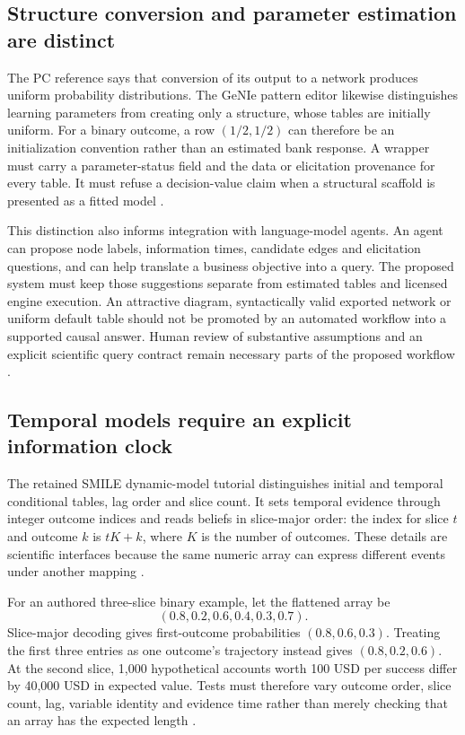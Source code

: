 \subsection{Structure conversion and parameter estimation are distinct}
The PC reference says that conversion of its output to a network produces
uniform probability distributions. The GeNIe pattern editor likewise
distinguishes learning parameters from creating only a structure, whose
tables are initially uniform. For a binary outcome, a row $(1/2,1/2)$ can
therefore be an initialization convention rather than an estimated bank
response. A wrapper must carry a parameter-status field and the data or
elicitation provenance for every table. It must refuse a decision-value
claim when a structural scaffold is presented as a fitted model
\citep{exec13_smile_pc,exec13_genie_pattern,exec24_smile_choice}.

This distinction also informs integration with language-model agents.
An agent can propose node labels, information times, candidate edges and
elicitation questions, and can help translate a business objective into a
query. The proposed system must keep those suggestions separate from
estimated tables and licensed engine execution. An attractive diagram,
syntactically valid exported network or uniform default table should not
be promoted by an automated workflow into a supported causal answer.
Human review of substantive assumptions and an explicit scientific query
contract remain necessary parts of the proposed workflow
\citep{exec24_smile_choice}.

\subsection{Temporal models require an explicit information clock}
The retained SMILE dynamic-model tutorial distinguishes initial and temporal
conditional tables, lag order and slice count. It sets temporal evidence
through integer outcome indices and reads beliefs in slice-major order:
the index for slice $t$ and outcome $k$ is $tK+k$, where $K$ is the number
of outcomes. These details are scientific interfaces because the same
numeric array can express different events under another mapping
\citep{exec13_ct_smile_tutorial}.

For an authored three-slice binary example, let the flattened array be
\[
 (0.8,0.2,0.6,0.4,0.3,0.7).
\]
Slice-major decoding gives first-outcome
probabilities $(0.8,0.6,0.3)$. Treating the first three entries as one
outcome's trajectory instead gives $(0.8,0.2,0.6)$. At the second slice,
1,000 hypothetical accounts worth 100 USD per success differ by
40,000 USD in expected value. Tests must therefore vary outcome order,
slice count, lag, variable identity and evidence time rather than merely
checking that an array has the expected length \citep{exec24_smile_choice}.

